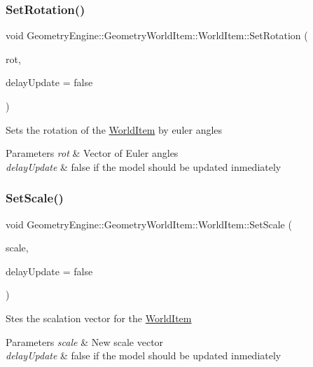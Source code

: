 \subsubsection{\texorpdfstring{SetRotation()}{SetRotation()}\hspace{0.1cm}{\footnotesize\ttfamily [2/2]}}
{\footnotesize\ttfamily void Geometry\+Engine\+::\+Geometry\+World\+Item\+::\+World\+Item\+::\+Set\+Rotation (\begin{DoxyParamCaption}\item[{const Q\+Vector3D \&}]{rot,  }\item[{bool}]{delay\+Update = {\ttfamily false} }\end{DoxyParamCaption})}

Sets the rotation of the \mbox{\hyperlink{class_geometry_engine_1_1_geometry_world_item_1_1_world_item}{World\+Item}} by euler angles 
\begin{DoxyParams}{Parameters}
{\em rot} & Vector of Euler angles \\
\hline
{\em delay\+Update} & false if the model should be updated inmediately \\
\hline
\end{DoxyParams}
\mbox{\label{class_geometry_engine_1_1_geometry_world_item_1_1_world_item_a0c1d06ab783adb8fd8b574b428933aed}} 
\subsubsection{\texorpdfstring{SetScale()}{SetScale()}}
{\footnotesize\ttfamily void Geometry\+Engine\+::\+Geometry\+World\+Item\+::\+World\+Item\+::\+Set\+Scale (\begin{DoxyParamCaption}\item[{const Q\+Vector3D \&}]{scale,  }\item[{bool}]{delay\+Update = {\ttfamily false} }\end{DoxyParamCaption})}

Stes the scalation vector for the \mbox{\hyperlink{class_geometry_engine_1_1_geometry_world_item_1_1_world_item}{World\+Item}} 
\begin{DoxyParams}{Parameters}
{\em scale} & New scale vector \\
\hline
{\em delay\+Update} & false if the model should be updated inmediately \\
\hline
\end{DoxyParams}
\mbox{\label{class_geometry_engine_1_1_geometry_world_item_1_1_world_item_a8ec661078740d53d1912f68a5bdb84f3}} 
